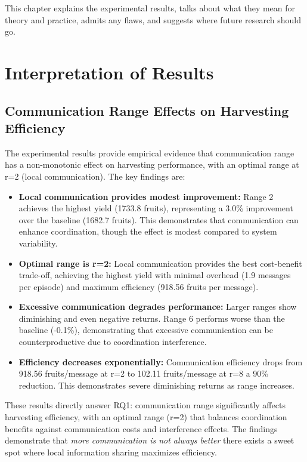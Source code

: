 
This chapter explains the experimental results, talks about what they mean for theory and practice, admits any flaws, and suggests where future research should go.

\section{Interpretation of Results}

\subsection{Communication Range Effects on Harvesting Efficiency}

The experimental results provide empirical evidence that communication range has a non-monotonic effect on harvesting performance, with an optimal range at r=2 (local communication). The key findings are:

\begin{itemize}
    \item \textbf{Local communication provides modest improvement:} Range 2 achieves the highest yield (1733.8 fruits), representing a 3.0\% improvement over the baseline (1682.7 fruits). This demonstrates that communication can enhance coordination, though the effect is modest compared to system variability.

    \item \textbf{Optimal range is r=2:} Local communication provides the best cost-benefit trade-off, achieving the highest yield with minimal overhead (1.9 messages per episode) and maximum efficiency (918.56 fruits per message).

    \item \textbf{Excessive communication degrades performance:} Larger ranges show diminishing and even negative returns. Range 6 performs worse than the baseline (-0.1\%), demonstrating that excessive communication can be counterproductive due to coordination interference.

    \item \textbf{Efficiency decreases exponentially:} Communication efficiency drops from 918.56 fruits/message at r=2 to 102.11 fruits/message at r=8 a 90\% reduction. This demonstrates severe diminishing returns as range increases.
\end{itemize}

These results directly answer RQ1: communication range significantly affects harvesting efficiency, with an optimal range (r=2) that balances coordination benefits against communication costs and interference effects. The findings demonstrate that \emph{more communication is not always better} there exists a sweet spot where local information sharing maximizes efficiency.

